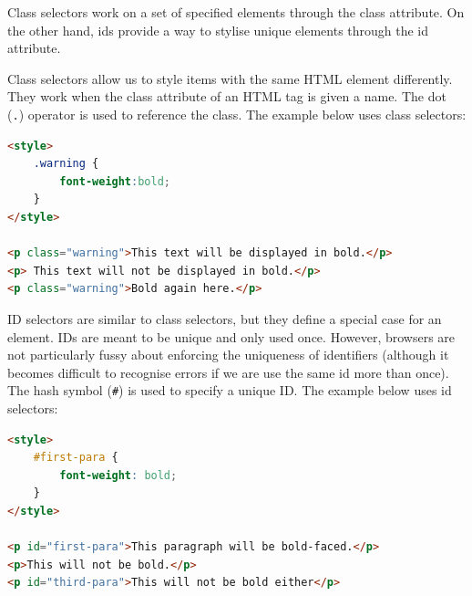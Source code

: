 \documentclass[a4paper, openany]{memoir}
\begin{document}
\noindent Class selectors work on a set of specified elements through the class attribute. On the other hand, ids provide a way to stylise unique elements through the id attribute.

\noindent Class selectors allow us to style items with the same HTML element differently. They work when the class attribute of an HTML tag is given a name. The dot (\texttt{.}) operator is used to reference the class. The example below uses class selectors:
\begin{lstlisting}[language=html]
<style>
    .warning {
        font-weight:bold;
    }
</style>

<p class="warning">This text will be displayed in bold.</p>
<p> This text will not be displayed in bold.</p>
<p class="warning">Bold again here.</p>
\end{lstlisting}

\noindent ID selectors are similar to class selectors, but they define a special case for an element. IDs are meant to be unique and only used once. However, browsers are not particularly fussy about enforcing the uniqueness of identifiers (although it becomes difficult to recognise errors if we are use the same id more than once). The hash symbol (\texttt{\#}) is used to specify a unique ID. The example below uses id selectors:
\begin{lstlisting}[language=html]
<style>
    #first-para {
        font-weight: bold;
    }
</style>

<p id="first-para">This paragraph will be bold-faced.</p>
<p>This will not be bold.</p>
<p id="third-para">This will not be bold either</p>
\end{lstlisting}
\end{document}
